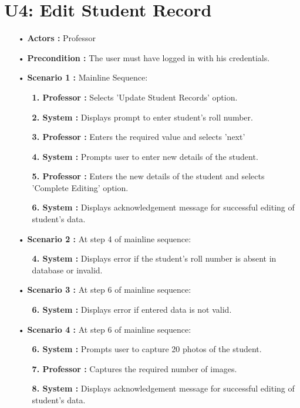 \documentclass{scrreprt}
\begin{document}
\section{U4: Edit Student Record}
\begin{itemize}
\item [•] \textbf{Actors :} Professor
\item[•] \textbf{Precondition :} The user must have logged in with his credentials.
\item [•] \textbf{Scenario 1 :} Mainline Sequence:
\begin{itemize}
\item [] \textbf{1. Professor :} Selects 'Update Student Records' option.
\item [] \textbf{2. System :} Displays prompt to enter student's roll number.
\item [] \textbf{3. Professor :} Enters the required value and selects 'next'
\item [] \textbf{4. System :} Prompts user to enter new details of the student.
\item [] \textbf{5. Professor :} Enters the new details of the student and selects 'Complete Editing' option.
\item [] \textbf{6. System :} Displays acknowledgement message for successful editing of student's data.
\end{itemize}
\item [•] \textbf{Scenario 2 :} At step 4 of mainline sequence:
\begin{itemize}
\item [] \textbf{4. System :} Displays error if the student's roll number is absent in database or invalid.
\end{itemize}
\item [•] \textbf{Scenario 3 :} At step 6 of mainline sequence:
\begin{itemize}
\item [] \textbf{6. System :} Displays error if entered data is not valid.
\end{itemize}
\item [•] \textbf{Scenario 4 :} At step 6 of mainline sequence:
\begin{itemize}
\item [] \textbf{6. System :} Prompts user to capture 20 photos of the student.
\item [] \textbf{7. Professor :} Captures the required number of images.
\item [] \textbf{8. System :} Displays acknowledgement message for successful editing of student's data.
\end{itemize}
\end{itemize}
\end{document}
